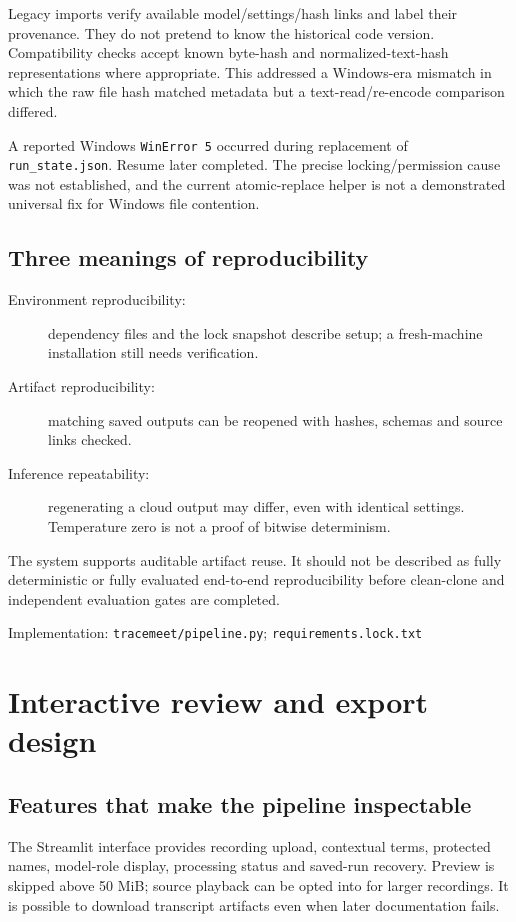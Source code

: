 \documentclass[11pt,a4paper]{article}
\newcommand{\code}[1]{\nolinkurl{#1}}
\newcommand{\src}[1]{\par{\footnotesize\raggedright\textcolor{accent}{Implementation:} #1\par}}
\begin{document}
Legacy imports verify available model/settings/hash links and label their provenance. They do not pretend to know the historical code version. Compatibility checks accept known byte-hash and normalized-text-hash representations where appropriate. This addressed a Windows-era mismatch in which the raw file hash matched metadata but a text-read/re-encode comparison differed.

A reported Windows \code{WinError 5} occurred during replacement of \code{run_state.json}. Resume later completed. The precise locking/permission cause was not established, and the current atomic-replace helper is not a demonstrated universal fix for Windows file contention.

\subsection{Three meanings of reproducibility}
\begin{description}
\item[Environment reproducibility:] dependency files and the lock snapshot describe setup; a fresh-machine installation still needs verification.
\item[Artifact reproducibility:] matching saved outputs can be reopened with hashes, schemas and source links checked.
\item[Inference repeatability:] regenerating a cloud output may differ, even with identical settings. Temperature zero is not a proof of bitwise determinism.
\end{description}
The system supports auditable artifact reuse. It should not be described as fully deterministic or fully evaluated end-to-end reproducibility before clean-clone and independent evaluation gates are completed.
\src{\code{tracemeet/pipeline.py}; \code{requirements.lock.txt}}

\section{Interactive review and export design}
\subsection{Features that make the pipeline inspectable}
The Streamlit interface provides recording upload, contextual terms, protected names, model-role display, processing status and saved-run recovery. Preview is skipped above 50 MiB; source playback can be opted into for larger recordings. It is possible to download transcript artifacts even when later documentation fails.
\end{document}

